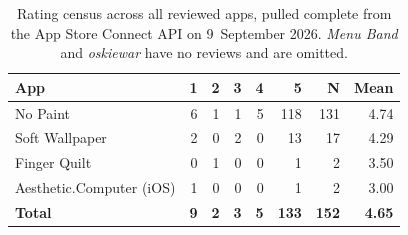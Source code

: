 \documentclass[10pt,letterpaper,twocolumn]{article}
\newcommand{\acdot}{{\color{acpink}.}}
\newcommand{\ac}{Aesthetic{\acdot}Computer}
\begin{document}
\begin{table}[h]
\centering
\footnotesize
\caption{Rating census across all reviewed apps, pulled complete from the App Store Connect API on 9~September 2026. \emph{Menu Band} and \emph{oskiewar} have no reviews and are omitted.}
\label{tab:ratings}
\begin{tabularx}{\columnwidth}{@{}X r r r r r r r@{}}
\toprule
\textbf{App} & \textbf{1} & \textbf{2} & \textbf{3} & \textbf{4} & \textbf{5} & \textbf{N} & \textbf{Mean} \\
\midrule
No Paint         & 6 & 1 & 1 & 5 & 118 & 131 & 4.74 \\
Soft Wallpaper   & 2 & 0 & 2 & 0 & 13  & 17  & 4.29 \\
Finger Quilt     & 0 & 1 & 0 & 0 & 1   & 2   & 3.50 \\
\ac{} (iOS)      & 1 & 0 & 0 & 0 & 1   & 2   & 3.00 \\
\midrule
\textbf{Total}   & \textbf{9} & \textbf{2} & \textbf{3} & \textbf{5} & \textbf{133} & \textbf{152} & \textbf{4.65} \\
\bottomrule
\end{tabularx}
\end{table}


\setlength{\bibsep}{1.6pt plus 0.3ex}
{\small

}
\end{document}
